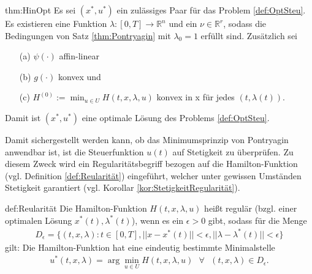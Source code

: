 \begin{theo}{thm:HinOpt}
	Es sei $(x^*,u^*)$ ein zulässiges Paar für das Problem \ref{def:OptSteu}. Es existieren eine Funktion $\lambda:[0,T] \rightarrow \mathbb{R}^n$ und ein $\nu \in \mathbb{R}^r$, sodass die Bedingungen von Satz \ref{thm:Pontryagin} mit $\lambda_0 = 1$ erfüllt sind. Zusätzlich sei
	\begin{itemize}
		\item[(a)] $\psi(\cdot)$ affin-linear \label{item:HinOptA}
		\item[(b)] $g(\cdot)$ konvex und \label{item:HinOptB}
		\item[(c)] $H^{(0)}:= \min_{u \in U} H(t,x,\lambda,u)$ konvex in x für jedes $(t,\lambda(t))$.\label{item:HinOptC}
	\end{itemize}
	Damit ist $(x^*,u^*)$ eine optimale Lösung des Problems \ref{def:OptSteu}.
\end{theo}

Damit sichergestellt werden kann, ob das Minimumsprinzip von Pontryagin anwendbar ist, ist die Steuerfunktion $u(t)$ auf Stetigkeit zu überprüfen. Zu diesem Zweck wird ein Regularitätsbegriff bezogen auf die Hamilton-Funktion (vgl. Definition \ref{def:Reularität}) eingeführt, welcher unter gewissen Umständen Stetigkeit garantiert (vgl. Korollar \ref{kor:StetigkeitRegularität}).

\begin{definition}{def:Reularität}
	Die Hamilton-Funktion $H(t,x,\lambda,u)$ heißt regulär (bzgl. einer optimalen Lösung $x^*(t), \lambda^*(t)$), wenn es ein $\epsilon > 0$ gibt, sodass für die Menge
	\begin{align*}
	D_\epsilon = \{(t,x,\lambda):t \in [0,T], || x - x^*(t) || < \epsilon, || \lambda - \lambda^*(t) || < \epsilon \}
	\end{align*}
	gilt: Die Hamilton-Funktion hat eine eindeutig bestimmte Minimalstelle
	\begin{align*}
	u^*(t,x,\lambda) = \operatorname{arg} \min\limits_{u\in U} H(t,x,\lambda,u) \text{ } \forall \text{ } (t,x,\lambda) \in D_\epsilon.
	\end{align*}
\end{definition}


